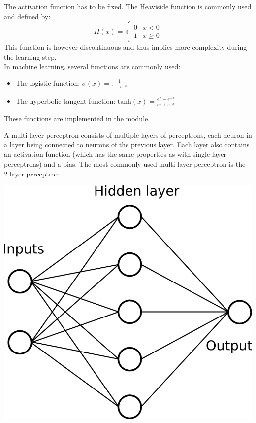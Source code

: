 {The activation function has to be fixed. The Heaviside function is commonly used and defined by:
\[H(x)= \begin{cases}
      0 & x< 0 \\
      1 & x\geq 0 
   \end{cases}
\]
This function is however discontinuous and thus implies more complexity during the learning step.\\
In machine learning, several functions are commonly used:
\begin{itemize}
 \item The logistic function:
$\displaystyle \sigma(x) = \frac{1}{1+e^{-x}}$
 \item The hyperbolic tangent function:
$\displaystyle \text{tanh}(x) = \frac{e^x - e^{-x}}{e^x+e^{-x}}$
\end{itemize}
These functions are implemented in the module.

A multi-layer perceptron consists of multiple layers of perceptrons, each neuron in a layer being connected to neurons of the previous layer.
Each layer also contains an activation function (which has the same properties as with single-layer perceptrons) and a bias.  The most commonly
used multi-layer perceptron is the 2-layer perceptron:
\begin{center}
\includegraphics[scale=0.3]{single_layer.png}
\end{center}

}
